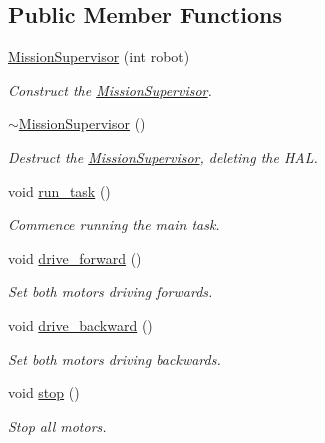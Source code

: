 \subsection*{Public Member Functions}
\begin{DoxyCompactItemize}
\item 
\hyperlink{classIDP_1_1MissionSupervisor_afc6a54e04718d919b2b48458a47304b2}{MissionSupervisor} (int robot)
\begin{DoxyCompactList}\small\item\em Construct the \hyperlink{classIDP_1_1MissionSupervisor}{MissionSupervisor}. \item\end{DoxyCompactList}\item 
\hyperlink{classIDP_1_1MissionSupervisor_aa43dab8c02cd596d0f5df6b3af5aade4}{$\sim$MissionSupervisor} ()
\begin{DoxyCompactList}\small\item\em Destruct the \hyperlink{classIDP_1_1MissionSupervisor}{MissionSupervisor}, deleting the HAL. \item\end{DoxyCompactList}\item 
void \hyperlink{classIDP_1_1MissionSupervisor_a06fc1fcf6272651d50938fd94306ac24}{run\_\-task} ()
\begin{DoxyCompactList}\small\item\em Commence running the main task. \item\end{DoxyCompactList}\item 
void \hyperlink{classIDP_1_1MissionSupervisor_af8c6a3073190a4479211753fe5f50a36}{drive\_\-forward} ()
\begin{DoxyCompactList}\small\item\em Set both motors driving forwards. \item\end{DoxyCompactList}\item 
void \hyperlink{classIDP_1_1MissionSupervisor_ae5d6e9a37417126da780583349b48d44}{drive\_\-backward} ()
\begin{DoxyCompactList}\small\item\em Set both motors driving backwards. \item\end{DoxyCompactList}\item 
void \hyperlink{classIDP_1_1MissionSupervisor_ad11e444b6be1d51c3339bd6397d45fd4}{stop} ()
\begin{DoxyCompactList}\small\item\em Stop all motors. \item\end{DoxyCompactList}\item 

\end{DoxyCompactItemize}
